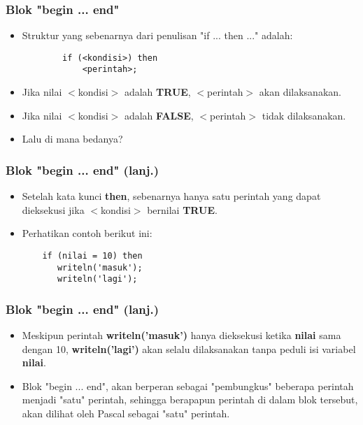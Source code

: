 \documentclass{beamer}
\begin{document}
\begin{frame}[fragile]
\frametitle{Blok "begin ... end"}
\begin{itemize}
    \item Struktur yang sebenarnya dari penulisan "if ... then ..." adalah:
    \begin{lstlisting}
        if (<kondisi>) then
            <perintah>;
    \end{lstlisting}
    \item Jika nilai $<$kondisi$>$ adalah \textbf{TRUE}, $<$perintah$>$ akan dilaksanakan.
    \item Jika nilai $<$kondisi$>$ adalah \textbf{FALSE}, $<$perintah$>$ tidak dilaksanakan.
    \item Lalu di mana bedanya?
\end{itemize}
\end{frame}

\begin{frame}[fragile]
\frametitle{Blok "begin ... end" (lanj.)}
\begin{itemize}
    \item Setelah kata kunci \textbf{then}, sebenarnya hanya \alert{satu} perintah yang dapat dieksekusi jika $<$kondisi$>$ bernilai \textbf{TRUE}.
    \item Perhatikan contoh berikut ini:
    \begin{lstlisting}
    if (nilai = 10) then
       writeln('masuk');
       writeln('lagi');
    \end{lstlisting}
\end{itemize}
\end{frame}

\begin{frame}[fragile]
\frametitle{Blok "begin ... end" (lanj.)}
\begin{itemize}
    \item Meskipun perintah \textbf{writeln('masuk')} hanya dieksekusi ketika \textbf{nilai} sama dengan 10, \textbf{writeln('lagi')} akan \alert{selalu dilaksanakan} tanpa peduli isi variabel \textbf{nilai}.
    \item Blok "begin ... end", akan berperan sebagai "pembungkus" beberapa perintah menjadi "satu" perintah, sehingga berapapun perintah di dalam blok tersebut, akan dilihat oleh Pascal sebagai "satu" perintah.
\end{itemize}
\end{frame}
\end{document}

